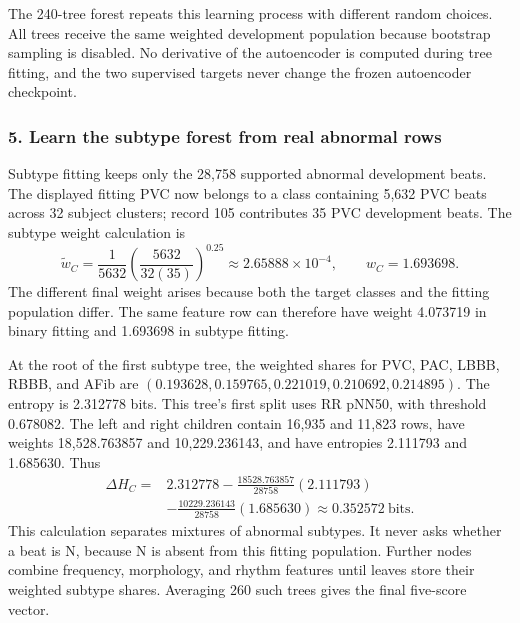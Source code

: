 The 240-tree forest repeats this learning process with different random
choices. All trees receive the same weighted development population because
bootstrap sampling is disabled. No derivative of the autoencoder is computed
during tree fitting, and the two supervised targets never change the frozen
autoencoder checkpoint.

\subsubsection*{5. Learn the subtype forest from real abnormal rows}

Subtype fitting keeps only the 28,758 supported abnormal development beats.
The displayed fitting PVC now belongs to a class containing 5,632 PVC beats
across 32 subject clusters; record 105 contributes 35 PVC development beats.
The subtype weight calculation is
\begin{equation}
 \widetilde w_C=\frac{1}{5632}
 \left(\frac{5632}{32(35)}\right)^{0.25}
 \approx2.65888\times10^{-4},\qquad w_C=1.693698.
 \label{eq:real-subtype-weight}
\end{equation}
The different final weight arises because both the target classes and the
fitting population differ. The same feature row can therefore have weight
4.073719 in binary fitting and 1.693698 in subtype fitting.

At the root of the first subtype tree, the weighted shares for PVC, PAC,
LBBB, RBBB, and AFib are
$(0.193628,0.159765,0.221019,0.210692,0.214895)$.
The entropy is 2.312778 bits. This tree's first split uses RR pNN50, with
threshold 0.678082. The left and right children contain 16,935 and 11,823
rows, have weights 18,528.763857 and 10,229.236143, and have entropies
2.111793 and 1.685630. Thus
\begin{equation}
 \begin{aligned}
 \Delta H_C={}&2.312778
 -\frac{18528.763857}{28758}(2.111793)\\
 &-\frac{10229.236143}{28758}(1.685630)
 \approx0.352572\ \text{bits}.
 \end{aligned}
 \label{eq:real-subtype-root-gain}
\end{equation}
This calculation separates mixtures of abnormal subtypes. It never asks
whether a beat is N, because N is absent from this fitting population.
Further nodes combine frequency, morphology, and rhythm features until
leaves store their weighted subtype shares. Averaging 260 such trees gives
the final five-score vector.

